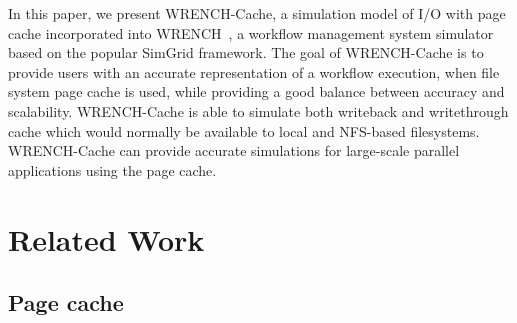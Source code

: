 \documentclass[conference]{IEEEtran}
\begin{document}

        In this paper, we present WRENCH-Cache, a simulation model of I/O with page
        cache incorporated into WRENCH~\cite{casanova2018wrench}, a workflow management system simulator based on
        the popular SimGrid framework. The goal of WRENCH-Cache is to provide users
        with an accurate representation of a workflow execution, when file system page
        cache is used, while providing a good balance between accuracy and scalability.
        WRENCH-Cache is able to simulate both writeback and writethrough
        cache which would normally be available to local and NFS-based filesystems.
        WRENCH-Cache can provide accurate simulations for large-scale parallel
        applications using the page cache.
         
		
    \section{Related Work}        
    \label{relatedwork}    
        
        \subsection{Page cache}
            
\end{document}
